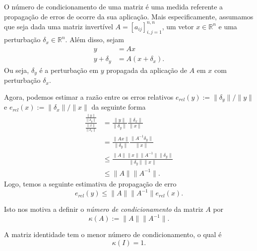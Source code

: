 O número de condicionamento de uma matriz é uma medida referente a propagação de erros de ocorre da sua aplicação. Mais especificamente, assumamos que seja dada uma matriz invertível $A = [a_{ij}]_{i,j=1}^{n,n}$, um vetor $x\in\mathbb{R}^n$ e uma perturbação $\delta_x\in\mathbb{R}^n$. Além disso, sejam
\begin{align}
  y &= Ax\\
  y + \delta_y &= A(x+\delta_x).
\end{align}
Ou seja, $\delta_y$ é a perturbação em $y$ propagada da aplicação de $A$ em $x$ com perturbação $\delta_x$.

Agora, podemos estimar a razão entre os erros relativos $e_{rel}(y) := \|\delta_y\|/\|y\|$ e $e_{rel}(x) := \|\delta_x\|/\|x\|$ da seguinte forma 
\begin{align}
  \frac{\frac{\|y\|}{\|\delta_y\|}}{\frac{\|x\|}{\|\delta_x\|}} &= \frac{\|y\|}{\|\delta_y\|}\frac{\|\delta_x\|}{\|x\|}\\
  &=\frac{\|Ax\|}{\|\delta_y\|}\frac{\|A^{-1}\delta_y\|}{\|x\|} \\
  &\leq \frac{\|A\|\|x\|\|A^{-1}\|\|\delta_y\|}{\|\delta_y\|\|x\|}\\
  &\leq \|A\|\|A^{-1}\|.
\end{align}
Logo, temos a seguinte estimativa de propagação de erro
\begin{equation}
  e_{rel}(y) \leq \|A\|\|A^{-1}\|e_{rel}(x).
\end{equation}

Isto nos motiva a definir o \emph{número de condicionamento} da matriz $A$ por
\begin{equation}
  \kappa(A) := \|A\|\|A^{-1}\|.
\end{equation}

\begin{obs}
  A matriz identidade tem o menor número de condicionamento, o qual é
  \begin{equation}
    \kappa(I) = 1.
  \end{equation}
\end{obs}

